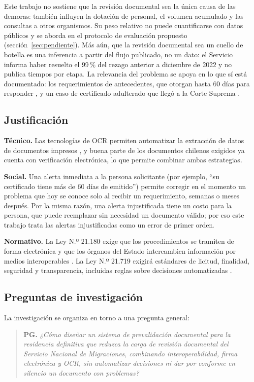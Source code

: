 \documentclass[11pt,a4paper]{article}
\begin{document}
Este trabajo no sostiene que la revisión documental sea la única causa de las demoras: también influyen la dotación de personal, el volumen acumulado y las consultas a otros organismos. Su peso relativo no puede cuantificarse con datos públicos y se aborda en el protocolo de evaluación propuesto (sección~\ref{sec:pendiente}). Más aún, que la revisión documental sea un cuello de botella es una inferencia a partir del flujo publicado, no un dato: el Servicio informa haber resuelto el 99\,\% del rezago anterior a diciembre de 2022 y no publica tiempos por etapa. La relevancia del problema se apoya en lo que sí está documentado: los requerimientos de antecedentes, que otorgan hasta 60 días para responder \cite{sermigrd}, y un caso de certificado adulterado que llegó a la Corte Suprema \cite{cs2026}.

\subsection{Justificación}
\textbf{Técnico.} Las tecnologías de OCR permiten automatizar la extracción de datos de documentos impresos \cite{hegghammer2022}, y buena parte de los documentos chilenos exigidos ya cuenta con verificación electrónica, lo que permite combinar ambas estrategias.

\textbf{Social.} Una alerta inmediata a la persona solicitante (por ejemplo, ``su certificado tiene más de 60 días de emitido'') permite corregir en el momento un problema que hoy se conoce solo al recibir un requerimiento, semanas o meses después. Por la misma razón, una alerta injustificada tiene un costo para la persona, que puede reemplazar sin necesidad un documento válido; por eso este trabajo trata las alertas injustificadas como un error de primer orden.

\textbf{Normativo.} La Ley N.º 21.180 exige que los procedimientos se tramiten de forma electrónica y que los órganos del Estado intercambien información por medios interoperables \cite{ley21180}. La Ley N.º 21.719 exigirá estándares de licitud, finalidad, seguridad y transparencia, incluidas reglas sobre decisiones automatizadas \cite{ley21719}.

\subsection{Preguntas de investigación}
\label{sec:pregunta}
La investigación se organiza en torno a una pregunta general:

\begin{quote}
\textbf{PG.} \emph{¿Cómo diseñar un sistema de prevalidación documental para la residencia definitiva que reduzca la carga de revisión documental del Servicio Nacional de Migraciones, combinando interoperabilidad, firma electrónica y OCR, sin automatizar decisiones ni dar por conforme en silencio un documento con problemas?}
\end{quote}
\end{document}
